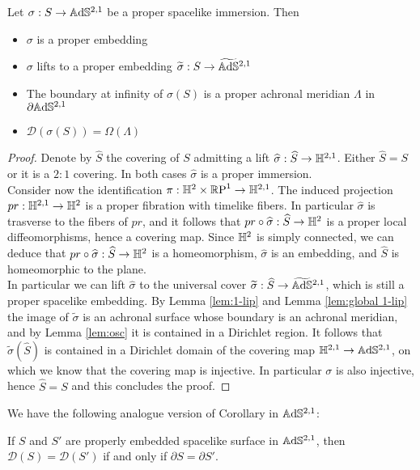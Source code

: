 \begin{proposition}\label{prop:surface in ads}
    Let $\sigma : S \to \mathbb{A}\mathrm{d}\mathbb{S}^{2,1}$ be a proper spacelike immersion. Then
    \begin{itemize}
        \item $\sigma$ is a proper embedding
        \item $\sigma$ lifts to a proper embedding $\widetilde{\sigma}: S \to \widetilde{\mathbb{A}\mathrm{d}\mathbb{S}}{}^{2,1}$
        \item The boundary at infinity of $\sigma(S)$ is a proper achronal meridian $\Lambda$ in $\partial\mathbb{A}\mathrm{d}\mathbb{S}^{2,1}$
        \item $\mathcal{D}(\sigma(S)) = \Omega(\Lambda)$
    \end{itemize}
\end{proposition}
\begin{proof}
    Denote by $\widehat{S}$ the covering of $S$ admitting a lift $\widehat{\sigma}: \widehat{S} \to \mathbb{H}^{2,1}$. Either $\widehat{S}=S$ or it is a $2:1$ covering. In both cases $\widehat{\sigma}$ is a proper immersion.\\
    Consider now the identification $\pi : \mathbb{H}^2 \times \mathbb{R}\textup{P}^1 \to \mathbb{H}^{2,1}$. The induced projection $pr:\mathbb{H}^{2,1} \to \mathbb{H}^2$ is a proper fibration with timelike fibers. In particular $\widehat{\sigma}$ is trasverse to the fibers of $pr$, and it follows that $pr \circ \widehat{\sigma}: \widehat{S} \to \mathbb{H}^2$ is a proper local diffeomorphisms, hence a covering map. Since $\mathbb{H}^2$ is simply connected, we can deduce that $pr \circ \widehat{\sigma}: \widehat{S} \to \mathbb{H}^2$ is a homeomorphism, $\widehat{\sigma}$ is an embedding, and $\widehat{S}$ is homeomorphic to the plane.\\
    In particular we can lift $\widehat{\sigma}$ to the universal cover $\widetilde{\sigma}: \widehat{S}\to\widetilde{\mathbb{A}\mathrm{d}\mathbb{S}}{}^{2,1}$, which is still a proper spacelike embedding. By Lemma \ref{lem:1-lip} and Lemma \ref{lem:global 1-lip} the image of $\widetilde{\sigma}$ is an achronal surface whose boundary is an achronal meridian, and by Lemma \ref{lem:osc} it is contained in a Dirichlet region. It follows that $\widetilde{\sigma}(\widehat{S})$ is contained in a Dirichlet domain of the covering map $\mathbb{H}^{2,1}\to\mathbb{A}\mathrm{d}\mathbb{S}^{2,1}$, on which we know that the covering map is injective. In particular $\sigma$ is also injective, hence $\widehat{S}=S$ and this concludes the proof.
\end{proof}
We have the following analogue version of Corollary in $\mathbb{A}\mathrm{d}\mathbb{S}^{2,1}$:
\begin{corollary}
    If $S$ and $S'$ are properly embedded spacelike surface in $\mathbb{A}\mathrm{d}\mathbb{S}^{2,1}$, then $\mathcal{D}(S) = \mathcal{D}(S')$ if and only if $\partial S = \partial S'$.
\end{corollary}

